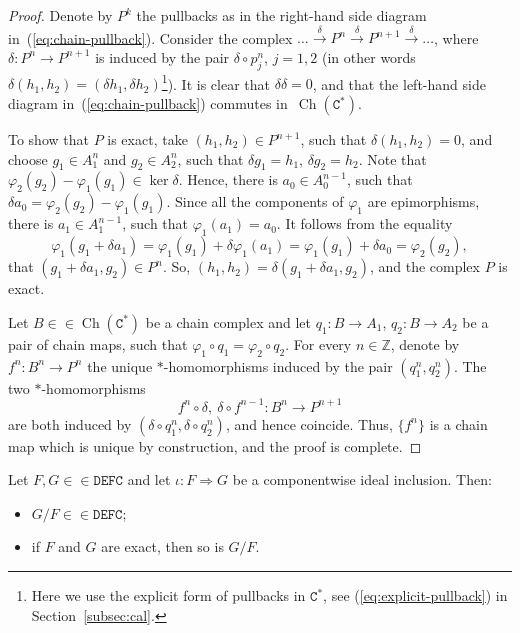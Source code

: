 \documentclass[10pt]{simplearticle}
\newcommand{\DEFC}{\mathbb{\mathtt{DEFC}}}
\newcommand{\Cstar}{\mathtt{C^{*}}}
\newcommand{\Ch}{\operatorname{Ch}}
\begin{document}
\begin{proof}
Denote by $P^{k}$ the pullbacks as in the right-hand side diagram
in~(\ref{eq:chain-pullback}). Consider the complex $\dots\xrightarrow{\delta}P^{n}\xrightarrow{\delta}P^{n+1}\xrightarrow{\delta}\dots$,
where $\delta\colon P^{n}\to P^{n+1}$ is induced by the pair $\delta\circ p^{n}_{j}$,
$j=1,2$ (in other words $\delta(h_{1},h_{2})=(\delta h_{1},\delta h_{2})$\footnote{Here we use the explicit form of pullbacks in $\Cstar$, see (\ref{eq:explicit-pullback})
in Section~\ref{subsec:cal}.}). It is clear that $\delta\delta=0$, and that the left-hand side
diagram in~(\ref{eq:chain-pullback}) commutes in~$\Ch(\Cstar)$.

To show that $P$ is exact, take $(h_{1},h_{2})\in P^{n+1}$, such
that $\delta(h_{1},h_{2})=0$, and choose $g_{1}\in A^{n}_{1}$ and
$g_{2}\in A^{n}_{2}$, such that $\delta g_{1}=h_{1}$, $\delta g_{2}=h_{2}$.
Note that $\varphi_{2}(g_{2})-\varphi_{1}(g_{1})\in\ker\delta$. Hence,
there is $a_{0}\in A^{n-1}_{0}$, such that $\delta a_{0}=\varphi_{2}(g_{2})-\varphi_{1}(g_{1})$.
Since all the components of $\varphi_{1}$ are epimorphisms, there
is $a_{1}\in A^{n-1}_{1}$, such that $\varphi_{1}(a_{1})=a_{0}$.
It follows from the equality
\[
\varphi_{1}(g_{1}+\delta a_{1})=\varphi_{1}(g_{1})+\delta\varphi_{1}(a_{1})=\varphi_{1}(g_{1})+\delta a_{0}=\varphi_{2}(g_{2}),
\]
that $(g_{1}+\delta a_{1},g_{2})\in P^{n}$. So, $(h_{1},h_{2})=\delta(g_{1}+\delta a_{1},g_{2})$,
and the complex $P$ is exact.

Let $B\in\in\Ch(\Cstar)$ be a chain complex and let $q_{1}\colon B\to A_{1}$,
$q_{2}\colon B\to A_{2}$ be a pair of chain maps, such that $\varphi_{1}\circ q_{1}=\varphi_{2}\circ q_{2}$.
For every $n\in\mathbb{Z}$, denote by $f^{n}\colon B^{n}\to P^{n}$
the unique
$*$-homomorphisms induced by the pair
$(q^{n}_{1},q^{n}_{2})$. The two $*$-homomorphisms
\[
f^{n}\circ\delta,~\delta\circ f^{n-1}\colon B^{n}\to P^{n+1}
\]
are both induced by $(\delta\circ q^{n}_{1},\delta\circ q^{n}_{2})$,
and hence coincide. Thus, $\{f^{n}\}$ is a chain map which is unique
by construction, and the proof is complete.
\end{proof}

\begin{lem}\label{lem:quot-decent}
Let $F,G\in\in\DEFC$ and let $\iota\colon F\Rightarrow G$
be a componentwise ideal inclusion. Then:
\begin{itemize}
\item $G/F\in\in\DEFC$;
\item if $F$ and $G$ are exact, then so is $G/F$.
\end{itemize}
\end{lem}
\end{document}
